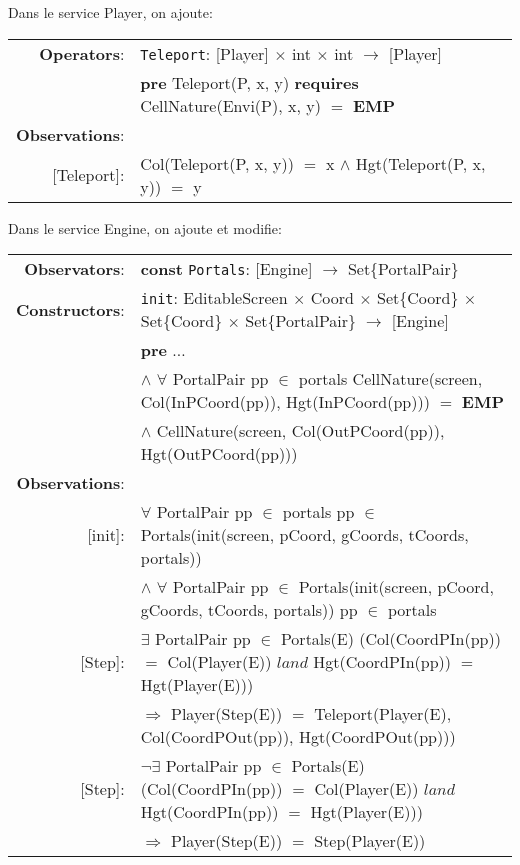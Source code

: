 \documentclass[8pt]{article}
\begin{document}
Dans le service \textrm{Player}, on ajoute:
{\small
  \begin{longtable}{rl}
    \textbf{Operators}: & \texttt{Teleport}: \textrm{[Player]} $\times$ \textrm{int} $\times$ \textrm{int} $\rightarrow$ \textrm{[Player]}\\
    & \quad \textbf{pre} \textrm{Teleport(P, x, y)} \textbf{requires} \textrm{CellNature(Envi(P), x, y)} $=$ \textbf{EMP}\\
    \textbf{Observations}:&\\
    \textrm{[Teleport]}:& \textrm{Col(Teleport(P, x, y))} $=$ x $\land$ \textrm{Hgt(Teleport(P, x, y))} $=$ y\\
  \end{longtable}
}

Dans le service \textrm{Engine}, on ajoute et modifie:

{\small
  \begin{longtable}{rl}
    \textbf{Observators}: & \textbf{const} \texttt{Portals}: \textrm{[Engine]} $\rightarrow$ \textrm{Set\{PortalPair\}} \\
    \textbf{Constructors}: &\texttt{init}: \textrm{EditableScreen} $\times$ \textrm{Coord} $\times$ \textrm{Set\{Coord\}} $\times$ \textrm{Set\{Coord\}} $\times$ \textrm{Set\{PortalPair\}} $\rightarrow$ \textrm{[Engine]} \\
      & \quad \textbf{pre} $\ldots$\\
      & \quad\quad\quad $\land$ $\forall$ \textrm{PortalPair} pp $\in$ \textrm{portals} \textrm{CellNature(screen, Col(InPCoord(pp)), Hgt(InPCoord(pp)))} $=$ \textbf{EMP}\\
    & \quad\quad\quad\quad\quad $\land$ \textrm{CellNature(screen, Col(OutPCoord(pp)), Hgt(OutPCoord(pp)))}\\
    \textbf{Observations}: &\\
    \textrm{[init]}: & $\forall$ \textrm{PortalPair} pp $\in$ \textrm{portals} pp $\in$ \textrm{Portals(init(screen, pCoord, gCoords, tCoords, portals))}\\
    & $\land$ $\forall$ \textrm{PortalPair} pp $\in$ \textrm{Portals(init(screen, pCoord, gCoords, tCoords, portals))} pp $\in$ portals\\
    \textrm{[Step]}: & $\exists$ \textrm{PortalPair} pp $\in$ \textrm{Portals(E)} (\textrm{Col(CoordPIn(pp))} $=$ \textrm{Col(Player(E))} $land$ \textrm{Hgt(CoordPIn(pp))} $=$ \textrm{Hgt(Player(E))})\\
    & \quad\quad $\Rightarrow$ \textrm{Player(Step(E))} $=$ \textrm{Teleport(Player(E), Col(CoordPOut(pp)), Hgt(CoordPOut(pp)))}\\
    \textrm{[Step]}: & $\neg\exists$ \textrm{PortalPair} pp $\in$ \textrm{Portals(E)} (\textrm{Col(CoordPIn(pp))} $=$ \textrm{Col(Player(E))} $land$ \textrm{Hgt(CoordPIn(pp))} $=$ \textrm{Hgt(Player(E))})\\
    & \quad\quad $\Rightarrow$ \textrm{Player(Step(E))} $=$ \textrm{Step(Player(E))}\\
  \end{longtable}}
\end{document}
